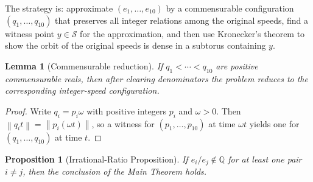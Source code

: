 \documentclass[12pt,a4paper]{amsart}
\newtheorem{lemma}[theorem]{Lemma}
\newtheorem{proposition}[theorem]{Proposition}
\theoremstyle{definition}
\theoremstyle{remark}
\newcommand{\norm}[1]{\left\|#1\right\|}
\begin{document}
The strategy is: approximate $(e_1,\ldots,e_{10})$ by a commensurable configuration
$(q_1,\ldots,q_{10})$ that preserves all integer relations among the original speeds,
find a witness point $y\in\mathcal{S}$ for the approximation, and then use Kronecker's
theorem to show the orbit of the original speeds is dense in a subtorus containing $y$.

\begin{lemma}[Commensurable reduction]\label{lem:comred}
If $q_1<\cdots<q_{10}$ are positive commensurable reals, then after clearing denominators
the problem reduces to the corresponding integer-speed configuration.
\end{lemma}

\begin{proof}
Write $q_i=p_i\omega$ with positive integers $p_i$ and $\omega>0$. Then
$\norm{q_it}=\norm{p_i(\omega t)}$, so a witness for $(p_1,\ldots,p_{10})$ at time $\omega t$
yields one for $(q_1,\ldots,q_{10})$ at time $t$.
\end{proof}

\begin{proposition}[Irrational-Ratio Proposition]\label{prop:irrat}
If $e_i/e_j\notin\mathbb{Q}$ for at least one pair $i\ne j$, then the conclusion of the
Main Theorem holds.
\end{proposition}
\end{document}
